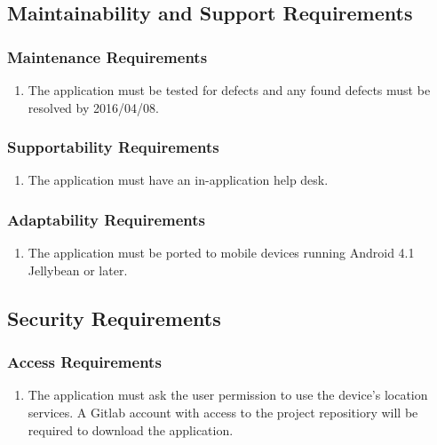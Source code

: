 \documentclass[]{article}
\begin{document}

\subsection{Maintainability and Support Requirements}
\label{sub:maintainability_and_support_requirements}

\cbstart
\subsubsection{Maintenance Requirements}
\label{ssub:maintenance_requirements}
\begin{enumerate}[{MS}1. ]
	\item The application must be tested for defects and any found defects must be resolved by 2016/04/08.
\end{enumerate}
\cbend

\cbstart
\subsubsection{Supportability Requirements}
\label{ssub:supportability_requirements}
\begin{enumerate}[{MS}2. ]
	\item The application must have an in-application help desk.
\end{enumerate}
\cbend

\cbstart
\subsubsection{Adaptability Requirements}
\label{ssub:adaptability_requirements}
\begin{enumerate}[{MS}3. ]
	\item The application must be ported to mobile devices running Android 4.1 Jellybean or later.
\end{enumerate}
\cbend


\subsection{Security Requirements}
\label{sub:security_requirements}

\subsubsection{Access Requirements}
\label{ssub:access_requirements}
\begin{enumerate}[{SR}1. ]
	\item The application must ask the user permission to use the device's location services. A Gitlab account with access to the project repositiory will be required to download the application.
\end{enumerate}
\end{document}
